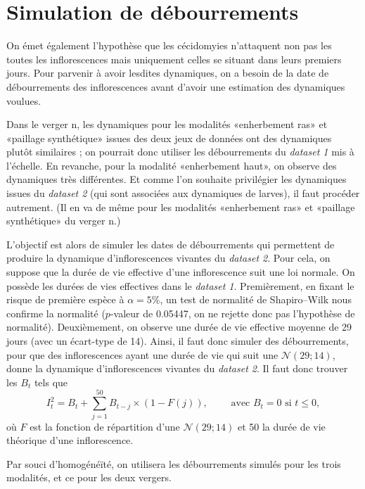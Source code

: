 \chapter{Simulation de débourrements} 
\label{chap:deb}

On émet également l'hypothèse que les cécidomyies n'attaquent non pas les toutes les inflorescences mais uniquement celles se situant dans leurs premiers jours.
Pour parvenir à avoir lesdites dynamiques, on a besoin de la date de débourrements des inflorescences avant d'avoir une estimation des dynamiques voulues.

Dans le verger n, les dynamiques pour les modalités «enherbement ras» et «paillage synthétique» issues des deux jeux de données ont des dynamiques plutôt similaires ; on pourrait donc utiliser les débourrements du \emph{dataset 1} mis à l'échelle.
En revanche, pour la modalité «enherbement haut», on observe des dynamiques très différentes. 
Et comme l'on souhaite privilégier les dynamiques issues du \emph{dataset 2} (qui sont associées aux dynamiques de larves), il faut procéder autrement.
(Il en va de même pour les modalités «enherbement ras» et «paillage synthétique» du verger n.)
 
L'objectif est alors de simuler les dates de débourrements qui permettent de produire la dynamique d'inflorescences vivantes du \emph{dataset 2}.
Pour cela, on suppose que la durée de vie effective d'une inflorescence suit une loi normale.
On possède les durées de vies effectives dans le \emph{dataset 1}.
Premièrement, en fixant le risque de première espèce à $\alpha = 5\%$, un test de normalité de Shapiro--Wilk nous confirme la normalité ($p$-valeur de 0.05447, on ne rejette donc pas l'hypothèse de normalité).
Deuxièmement, on observe une durée de vie effective moyenne de 29 jours (avec un écart-type de 14).
Ainsi, il faut donc simuler des débourrements, pour que des inflorescences ayant une durée de vie qui suit une $\mathcal{N}\left( 29; 14 \right)$, donne la dynamique d'inflorescences vivantes du \emph{dataset 2}.
Il faut donc trouver les $B_t$ tels que 
\[
I_{t}^{2} = B_t + \sum_{j = 1}^{50} B_{t - j} \times \left( 1 - F\left( j \right) \right),  \qquad \text{ avec } B_{t} = 0 \text{ si } t \leq 0,
\]
où $F$ est la fonction de répartition d'une $\mathcal{N}\left( 29;14 \right)$ et 50 la durée de vie théorique d'une inflorescence.
 
Par souci d'homogénéïté, on utilisera les débourrements simulés pour les trois modalités, et ce pour les deux vergers.
